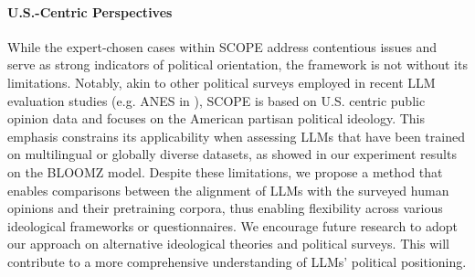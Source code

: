 \paragraph{U.S.-Centric Perspectives}  
While the expert-chosen cases within SCOPE address contentious issues and serve as strong indicators of political orientation, the framework is not without its limitations. Notably, akin to other political surveys employed in recent LLM evaluation studies (e.g.  ANES in \citealt{Bisbee_Clinton_Dorff_Kenkel_Larson_2024}), SCOPE is based on U.S. centric public opinion data and focuses on the American partisan political ideology. This emphasis constrains its applicability when assessing LLMs that have been trained on multilingual or globally diverse datasets, as showed in our experiment results on the BLOOMZ model. 
Despite these limitations, we propose a method that enables comparisons between the alignment of LLMs with the surveyed human opinions and their pretraining corpora, thus enabling flexibility across various ideological frameworks or questionnaires. We encourage future research to adopt our approach on alternative ideological theories and political surveys. This will contribute to a more comprehensive understanding of LLMs' political positioning.


